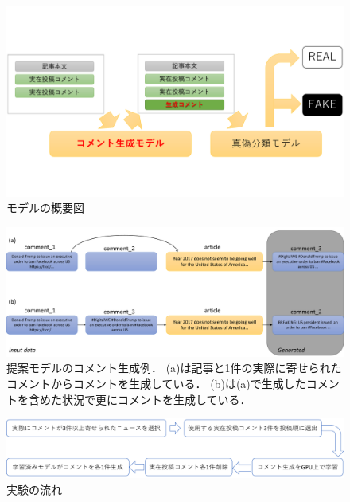\begin{figure}
    \centering
    \includegraphics[width=\linewidth,pagebox=cropbox,clip]{figures/fig_model.pdf}
    \caption{モデルの概要図}
    \label{fig:model}
\end{figure}

\begin{figure}[p]
    \centering
    \includegraphics[width=\linewidth,pagebox=cropbox,clip]{figures/fig_method.pdf}
    \caption{
        提案モデルのコメント生成例．
        (a)は記事と1件の実際に寄せられたコメントからコメントを生成している．
        (b)は(a)で生成したコメントを含めた状況で更にコメントを生成している．
    }
    \label{fig:method}
\end{figure}

\begin{figure}[t]
    \centering
    \includegraphics[width=\linewidth,pagebox=cropbox,clip]{figures/fig_process.pdf}
    \caption{実験の流れ}
    \label{fig:process}
\end{figure}

